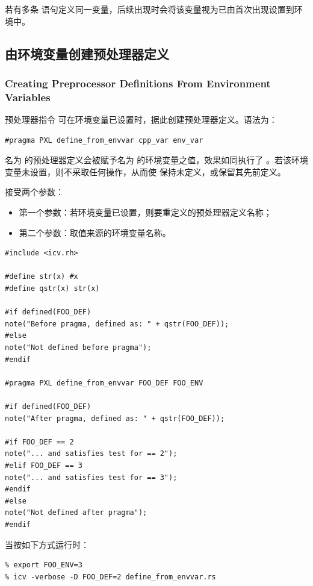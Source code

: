 \begin{noteBox}
若有多条  语句定义同一变量，后续出现时会将该变量视为已由首次出现设置到环境中。
\end{noteBox}

\subsection{由环境变量创建预处理器定义}
\subsubsection*{Creating Preprocessor Definitions From Environment Variables}

预处理器指令  可在环境变量已设置时，据此创建预处理器定义。语法为：
\begin{lstlisting}[style=pxl]
#pragma PXL define_from_envvar cpp_var env_var
\end{lstlisting}

名为  的预处理器定义会被赋予名为  的环境变量之值，效果如同执行了 。若该环境变量未设置，则不采取任何操作，从而使  保持未定义，或保留其先前定义。

 接受两个参数：
\begin{itemize}
  \item 第一个参数：若环境变量已设置，则要重定义的预处理器定义名称；
  \item 第二个参数：取值来源的环境变量名称。
\end{itemize}

\begin{lstlisting}[style=pxl]
#include <icv.rh>

#define str(x) #x
#define qstr(x) str(x)

#if defined(FOO_DEF)
note("Before pragma, defined as: " + qstr(FOO_DEF));
#else
note("Not defined before pragma");
#endif

#pragma PXL define_from_envvar FOO_DEF FOO_ENV

#if defined(FOO_DEF)
note("After pragma, defined as: " + qstr(FOO_DEF));

#if FOO_DEF == 2
note("... and satisfies test for == 2");
#elif FOO_DEF == 3
note("... and satisfies test for == 3");
#endif
#else
note("Not defined after pragma");
#endif
\end{lstlisting}

当按如下方式运行时：
\begin{lstlisting}
% export FOO_ENV=3
% icv -verbose -D FOO_DEF=2 define_from_envvar.rs
\end{lstlisting}

